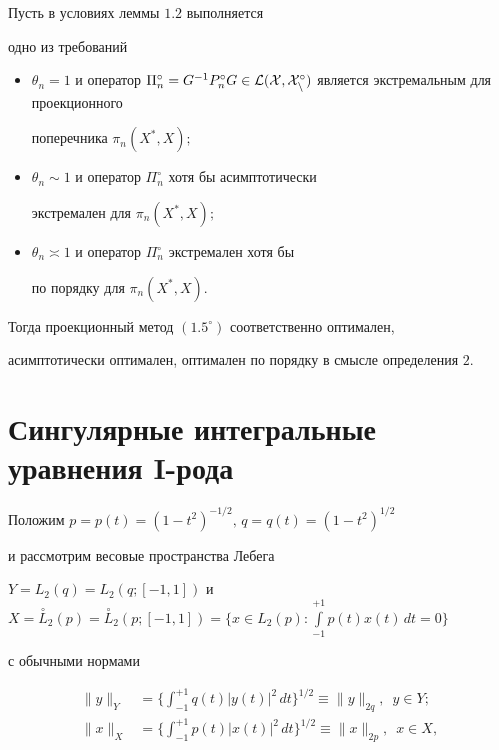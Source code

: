 \begin{thms}


Пусть в условиях леммы $1.2$ выполняется


одно из требований


\begin{itemize}


\item[а)] $\theta_n=1$ и оператор $\Pi_n^\circ=G^{-1}P_n^\circ G\in


\cal L(X,X_n^\circ)$ является экстремальным для проекционного


поперечника $\pi_n(X^*,X);$


\item[б)] $\theta_n\sim 1$ и оператор $\Pi_n^\circ$ хотя бы асимптотически


экстремален для $\pi_n(X^*,X);$


\item[в)] $\theta_n\asymp 1$ и оператор $\Pi_n^\circ$ экстремален хотя бы


по порядку для $\pi_n(X^*,X)$.


\end{itemize}


Тогда проекционный метод $(1.5^\circ)$ соответственно оптимален,


асимптотически оптимален, оптимален по порядку в смысле определения $2$.


\end{thms}





\section{Сингулярные интегральные уравнения I-рода}





Положим $p=p(t)=(1-t^2)^{-1/2},\, q=q(t)=(1-t^2)^{1/2}$


и рассмотрим весовые пространства Лебега


$Y=L_2(q)=L_2(q;[-1,1])$ и $X=\overset{\circ}{L}{}_2(p)=


\overset{\circ}{L}{}_2(p;[-1,1])=\Big\{ x\in L_2(p):


\int\limits_{-1}^{+1}p(t)x(t)\, dt=0\Big\}$


с обычными нормами


\begin{align*}


\|y\|_Y &=\bigg\{ \int_{-1}^{+1}q(t)|y(t)|^2\, dt\bigg\}^{1/2}


\equiv \|y\|_{2q},\ \; y\in Y; \\


%


\|x\|_X &=\bigg\{ \int_{-1}^{+1}p(t)|x(t)|^2\, dt\bigg\}^{1/2}


\equiv \|x\|_{2p},\ \; x\in X,


\end{align*}


